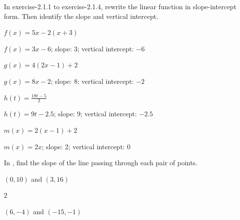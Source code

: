 In exercise-2.1.1 to exercise-2.1.4, rewrite the linear function in slope-intercept form. Then identify the slope and vertical intercept.

\begin{exercise}\label{exercise-2.1.1}
$\displaystyle f(x)=5x-2(x+3)$
\end{exercise}

\begin{solution}
    $f(x)=3x-6$; slope: 3; vertical intercept: $-6$
\end{solution}




\begin{exercise}
$\displaystyle g(x)=4(2x-1)+2$
\end{exercise}

\begin{solution}
    $g(x)=8x-2$; slope: 8; vertical intercept: $-2$
\end{solution}




\begin{exercise}
$\displaystyle h(t)=\frac{18t-5}{2}$
\end{exercise}

\begin{solution}
    $h(t)=9t-2.5$; slope: 9; vertical intercept: $-2.5$
\end{solution}




\begin{exercise}\label{exercise-2.1.4}
$\displaystyle m(x)=2(x-1)+2$
\end{exercise}

\begin{solution}
    $m(x)=2x$; slope: 2; vertical intercept: 0
\end{solution}






 In , find the slope of the line passing through each pair of points.

\begin{exercise}\label{exercise-2.1.5}
$(0,10)$ and $(3,16)$
\end{exercise}

\begin{solution}
    $2$
\end{solution}



\begin{exercise}
$(6,-4)$ and $(-15,-1)$
\end{exercise}

